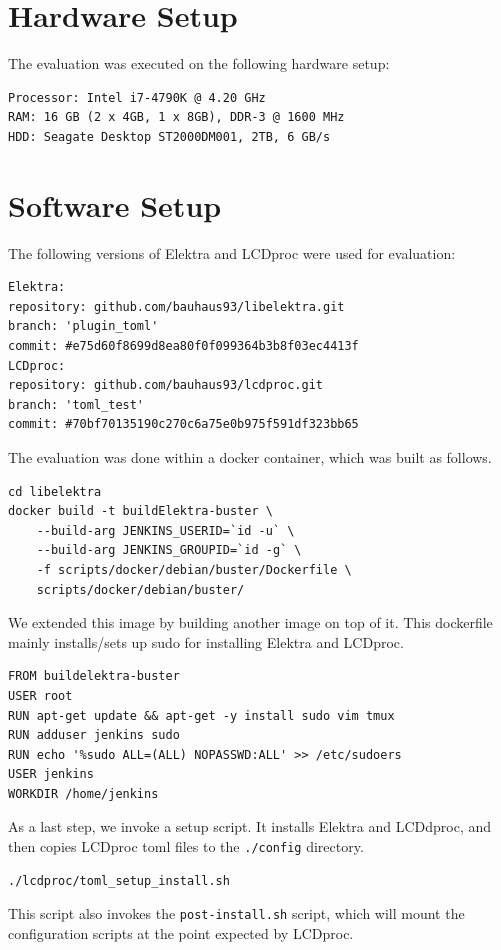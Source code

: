 \documentclass[draft,final]{vutinfth} %
\begin{document}
\section{Hardware Setup}
The evaluation was executed on the following hardware setup:
\begin{Verbatim}[frame=single]
Processor: Intel i7-4790K @ 4.20 GHz
RAM: 16 GB (2 x 4GB, 1 x 8GB), DDR-3 @ 1600 MHz 
HDD: Seagate Desktop ST2000DM001, 2TB, 6 GB/s
\end{Verbatim}

\section{Software Setup}

The following versions of Elektra and LCDproc were used for evaluation:
\begin{Verbatim}[frame=single]
Elektra:
repository: github.com/bauhaus93/libelektra.git
branch: 'plugin_toml'
commit: #e75d60f8699d8ea80f0f099364b3b8f03ec4413f
LCDproc:
repository: github.com/bauhaus93/lcdproc.git
branch: 'toml_test'
commit: #70bf70135190c270c6a75e0b975f591df323bb65
\end{Verbatim}


The evaluation was done within a docker container, which was built as follows.
\begin{Verbatim}[frame=single]
cd libelektra
docker build -t buildElektra-buster \
    --build-arg JENKINS_USERID=`id -u` \
    --build-arg JENKINS_GROUPID=`id -g` \
    -f scripts/docker/debian/buster/Dockerfile \
    scripts/docker/debian/buster/
\end{Verbatim}

We extended this image by building another image on top of it. This dockerfile mainly installs/sets up sudo for installing Elektra and LCDproc.
\begin{Verbatim}[frame=single]
FROM buildelektra-buster
USER root
RUN apt-get update && apt-get -y install sudo vim tmux
RUN adduser jenkins sudo
RUN echo '%sudo ALL=(ALL) NOPASSWD:ALL' >> /etc/sudoers
USER jenkins
WORKDIR /home/jenkins
\end{Verbatim}

As a last step, we invoke a setup script. It installs Elektra and LCDdproc, and then copies LCDproc \acrshort{toml} files to the \texttt{./config} directory.
\begin{Verbatim}[frame=single]
./lcdproc/toml_setup_install.sh
\end{Verbatim}
This script also invokes the \texttt{post-install.sh} script, which will mount the configuration scripts at the point expected by LCDproc.
\end{document}
